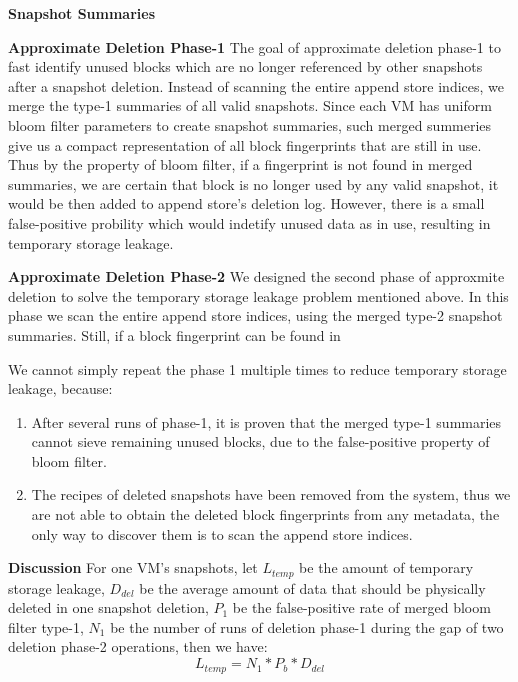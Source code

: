 {\bf Snapshot Summaries}

{\bf Approximate Deletion Phase-1}
The goal of approximate deletion phase-1 to fast identify unused blocks 
which are no longer referenced by other snapshots after a snapshot deletion.
Instead of scanning the entire append store indices, we merge the type-1 summaries of all
valid snapshots. Since each VM has uniform bloom filter parameters to create snapshot summaries, 
such merged summeries give us a compact representation of
all block fingerprints that are still in use.
Thus by the property of bloom filter, if a fingerprint is not found in merged summaries, 
we are certain that block is no longer used by any valid snapshot, it would be then added
to append store's deletion log.
However, there is a small false-positive probility which
would indetify unused data as in use, resulting in temporary storage leakage.

{\bf Approximate Deletion Phase-2}
We designed the second phase of approxmite deletion to solve the 
temporary storage leakage problem mentioned above.
In this phase we scan the entire append store indices, using the merged type-2 snapshot summaries.
Still, if a block fingerprint can be found in 

We cannot simply repeat the phase 1 multiple times to reduce temporary storage leakage, because:
\begin{enumerate} 
\item After several runs of phase-1, it is proven that the merged type-1 summaries cannot sieve remaining unused blocks, due to the false-positive property of bloom filter.
\item The recipes of deleted snapshots have been removed from the system, thus we are not able to obtain the deleted block fingerprints from any metadata, the only way to discover them is to scan the append store indices.
\end{enumerate}

{\bf Discussion}
For one VM's snapshots, let $L_{temp}$ be the amount of temporary storage leakage, 
$D_{del}$ be the average amount of data that should be physically deleted in one snapshot deletion,
$P_{1}$ be the false-positive rate of merged bloom filter type-1,
$N_1$ be the number of runs of deletion phase-1 during the gap of two deletion phase-2 operations, then we have:
\begin{equation}
L_{temp} = N_1 * P_b * D_{del}
\end{equation}

